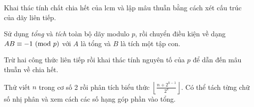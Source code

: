 \documentclass[./m.tex]{subfiles}
\begin{document}
\vspace{1em}

\begin{hint*}
	Khai thác tính chất chia hết của \( \mathrm{lcm} \) và lập mâu thuẫn bằng cách xét cấu trúc của dãy liên tiếp.
\end{hint*}

\vspace{1em}

\begin{hint*}
	Sử dụng \textit{tổng} và \textit{tích} toàn bộ dãy modulo \( p \),
	rồi chuyển điều kiện về dạng \( AB \equiv -1 \ (\mathrm{mod}\ p) \) với \( A \) là tổng và \( B \) là tích một tập con.
\end{hint*}

\vspace{1em}

\begin{hint*}
	Trừ hai công thức liên tiếp rồi khai thác tính nguyên tố của \( p \) để dẫn đến mâu thuẫn về chia hết.
\end{hint*}

\vspace{1em}

\begin{hint*}
	Thử viết \( n \) trong cơ số 2 rồi phân tích biểu thức \( \left\lfloor \tfrac{n + 2^{k-1}}{2^k} \right\rfloor \).  
    Có thể tách từng chữ số nhị phân và xem cách các số hạng góp phần vào tổng.
\end{hint*}
\end{document}
